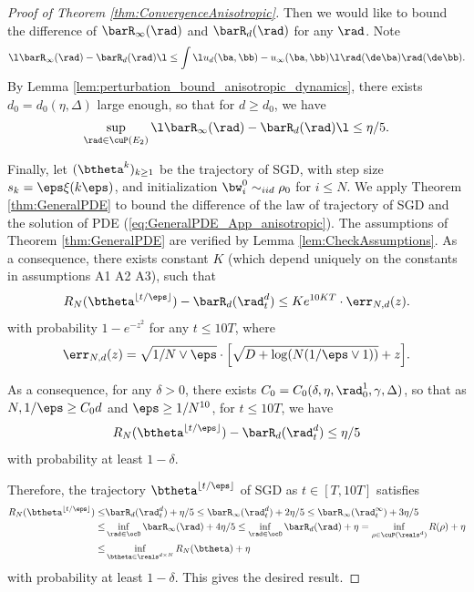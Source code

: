 \documentclass[11pt]{article}
\begin{document}
\begin{proof}[Proof of Theorem \ref{thm:ConvergenceAnisotropic}]
Then we would like to bound the difference of $\barR_\infty(\rad)$ and $\barR_d(\rad)$ for any $\rad$. Note 
\begin{align}
\l \barR_\infty(\rad) - \barR_d(\rad) \l \le \int \l u_d(\ba, \bb) - u_\infty(\ba, \bb)\l \rad(\de \ba) \rad(\de \bb).
\end{align}
By Lemma \ref{lem:perturbation_bound_anisotropic_dynamics}, there exists $d_0 = d_0(\eta, \Delta)$ large enough, so that for $d \ge d_0$, we have
\begin{align}
\sup_{\rad \in \cuP(E_2)} \l \barR_\infty(\rad) - \barR_d(\rad) \l \le \eta / 5.
\end{align}

Finally, let $(\btheta^{k})_{k \ge 1}$ be the trajectory of SGD, with step size $s_k = \eps \xi(k \eps)$, and initialization $\bw_i^0 \sim_{iid} \rho_0$ for $i \le N$. We apply Theorem \ref{thm:GeneralPDE} to bound the difference of the law of trajectory of SGD and the solution of PDE (\ref{eq:GeneralPDE_App_anisotropic}). The assumptions of Theorem \ref{thm:GeneralPDE} are verified by Lemma \ref{lem:CheckAssumptions}. As a consequence, there exists constant $K$ (which depend uniquely on the constants in assumptions {\sf A1} {\sf A2} {\sf A3}), such that 
\[
R_{N}(\btheta^{\lfloor t/\eps \rfloor}) - \barR_d(\rad_t^d) \le K e^{10 KT} \cdot \err_{N, d}(z).
\]
with probability $1 - e^{-z^2}$ for any $t \le 10 T$, where
\[
\err_{N, d}(z) =  \sqrt{1/N \vee \eps } \cdot \Big[\sqrt{D + \log (N (1/ \eps \vee 1))} + z \Big]. 
\]

As a consequence, for any $\delta > 0$, there exists $C_0 = C_0(\delta, \eta, \rad_0^1, \gamma, \Delta)$, so that as $N, 1/\eps \ge C_0 d$ and $\eps \ge 1/N^{10}$, for $t \le 10 T$, we have 
\[
R_{N}(\btheta^{\lfloor t/\eps \rfloor}) - \barR_d(\rad_t^d) \le \eta / 5
\]
with probability at least $1 - \delta$. 

Therefore, the trajectory $\btheta^{\lfloor t/\eps \rfloor}$ of SGD as $t \in [T, 10 T]$ satisfies
\[
\begin{aligned}
R_{N}(\btheta^{\lfloor t / \eps\rfloor}) \le&  \barR_d(\rad_t^d) + \eta/5 \le \barR_\infty(\rad_t^d) + 2\eta/5  \le \barR_\infty(\rad_t^\infty) + 3\eta / 5 \\
\le& \inf_{\rad \in \ocD} \barR_\infty(\rad) + 4\eta/5 \le \inf_{\rad \in \ocD} \barR_d(\rad) + \eta = \inf_{\rho \in \cuP(\reals^d)} R(\rho) + \eta \\
\le&\inf_{\btheta \in \reals^{d \times N}} R_N(\btheta) + \eta
\end{aligned}
\]
with probability at least $1 - \delta$. This gives the desired result. 
\end{proof}
\end{document}
